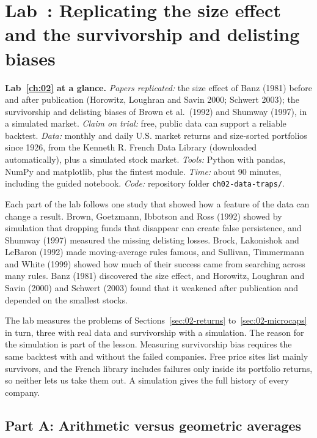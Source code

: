 \section{Lab~\thechapter: Replicating the size effect and the survivorship and delisting biases}
\label{sec:02-lab}

\begin{callout}
\textbf{Lab~\ref{ch:02} at a glance.} \emph{Papers replicated:} the size effect of Banz (1981) before and after publication (Horowitz, Loughran and Savin 2000; Schwert 2003); the survivorship and delisting biases of Brown et al.\ (1992) and Shumway (1997), in a simulated market. \emph{Claim on trial:} free, public data can support a reliable backtest. \emph{Data:} monthly and daily U.S. market returns and size-sorted portfolios since 1926, from the Kenneth R. French Data Library (downloaded automatically), plus a simulated stock market. \emph{Tools:} Python with pandas, NumPy and matplotlib, plus the fintest module. \emph{Time:} about 90 minutes, including the guided notebook. \emph{Code:} repository folder \texttt{ch02-data-traps/}.
\end{callout}

Each part of the lab follows one study that showed how a feature of the data can change a result. Brown, Goetzmann, Ibbotson and Ross (1992) showed by simulation that dropping funds that disappear can create false persistence, and Shumway (1997) measured the missing delisting losses. Brock, Lakonishok and LeBaron (1992) made moving-average rules famous, and Sullivan, Timmermann and White (1999) showed how much of their success came from searching across many rules. Banz (1981) discovered the size effect, and Horowitz, Loughran and Savin (2000) and Schwert (2003) found that it weakened after publication and depended on the smallest stocks.

The lab measures the problems of Sections~\ref{sec:02-returns} to~\ref{sec:02-microcaps} in turn, three with real data and survivorship with a simulation. The reason for the simulation is part of the lesson. Measuring survivorship bias requires the same backtest with and without the failed companies. Free price sites list mainly survivors, and the French library includes failures only inside its portfolio returns, so neither lets us take them out. A simulation gives the full history of every company.

\subsection*{Part A: Arithmetic versus geometric averages}

